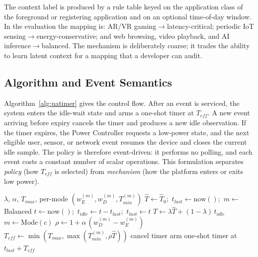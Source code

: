\documentclass[journal]{IEEEtran}
\begin{document}
The context label is produced by a rule table keyed on the application class of the foreground or registering application and on an optional time-of-day window. In the evaluation the mapping is: AR/VR gaming$\rightarrow$latency-critical; periodic IoT sensing$\rightarrow$energy-conservative; and web browsing, video playback, and AI inference$\rightarrow$balanced. The mechanism is deliberately coarse; it trades the ability to learn latent context for a mapping that a developer can audit.

\subsection{Algorithm and Event Semantics}
Algorithm~\ref{alg:uatimer} gives the control flow. After an event is serviced, the system enters the idle-wait state and arms a one-shot timer at $T_{eff}$. A new event arriving before expiry cancels the timer and produces a new idle observation. If the timer expires, the Power Controller requests a low-power state, and the next eligible user, sensor, or network event resumes the device and closes the current idle sample. The policy is therefore event-driven: it performs no polling, and each event costs a constant number of scalar operations. This formulation separates \emph{policy} (how $T_{eff}$ is selected) from \emph{mechanism} (how the platform enters or exits low power).

\begin{algorithm}[t]
\caption{UATimer event-driven control}
\label{alg:uatimer}
\small
\begin{algorithmic}[1]
\Require $\lambda$, $\alpha$, $T_{max}$, per-mode $(w_E^{(m)},w_D^{(m)},T_{min}^{(m)})$
\State $\hat T\gets \hat T_0$;\ $t_{last}\gets \mathrm{now}()$;\ $m\gets$ Balanced
  \State $t\gets\mathrm{now}()$;\ $t_{idle}\gets t-t_{last}$;\ $t_{last}\gets t$
  \State $\hat T\gets\lambda\hat T+(1-\lambda)\,t_{idle}$ 
  \State {}
\EndProcedure
{}
  \State $m\gets\mathrm{Mode}(c)$ 
  \State {}
\EndProcedure
{}
  \State $\rho\gets 1+\alpha\,(w_D^{(m)}-w_E^{(m)})$
  \State $T_{eff}\gets\min(T_{max},\max(T_{min}^{(m)},\rho\hat T))$ 
   \State cancel timer
  \Else \State arm one-shot timer at $t_{last}+T_{eff}$
  \EndIf
\EndProcedure
{}
   \State {} 
  \EndIf
\EndProcedure
\end{algorithmic}
\end{algorithm}
\end{document}

